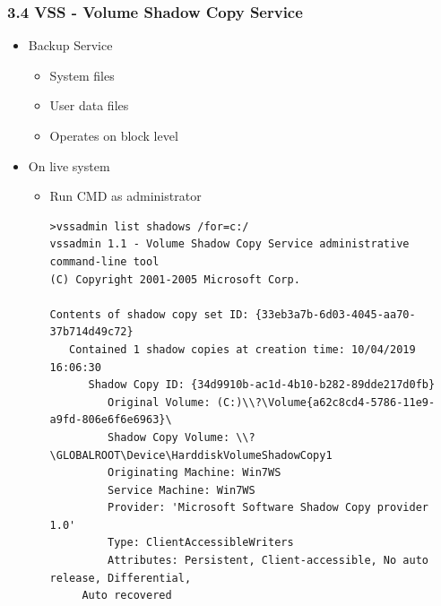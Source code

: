 \begin{frame}[fragile]
  \frametitle{3.4 VSS - Volume Shadow Copy Service}
    \begin{itemize}
	    \item Backup Service
            \begin{itemize}
	         \item System files
	         \item User data files
	         \item Operates on block level
            \end{itemize}
	    \item On live system
            \begin{itemize}
	         \item Run CMD as administrator
  \begin{lstlisting}[basicstyle=\tiny]
>vssadmin list shadows /for=c:/
vssadmin 1.1 - Volume Shadow Copy Service administrative command-line tool
(C) Copyright 2001-2005 Microsoft Corp.

Contents of shadow copy set ID: {33eb3a7b-6d03-4045-aa70-37b714d49c72}
   Contained 1 shadow copies at creation time: 10/04/2019 16:06:30
      Shadow Copy ID: {34d9910b-ac1d-4b10-b282-89dde217d0fb}
         Original Volume: (C:)\\?\Volume{a62c8cd4-5786-11e9-a9fd-806e6f6e6963}\
         Shadow Copy Volume: \\?\GLOBALROOT\Device\HarddiskVolumeShadowCopy1
         Originating Machine: Win7WS
         Service Machine: Win7WS
         Provider: 'Microsoft Software Shadow Copy provider 1.0'
         Type: ClientAccessibleWriters
         Attributes: Persistent, Client-accessible, No auto release, Differential,
	 Auto recovered
  \end{lstlisting}
            \end{itemize}
  \end{itemize}
\end{frame}


